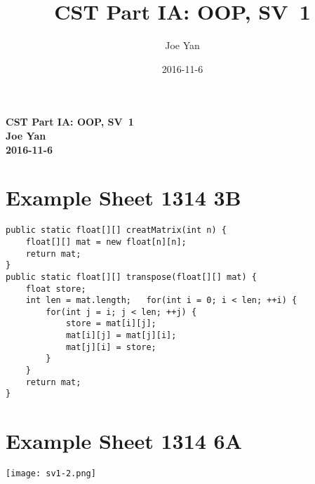 \documentclass[10pt,twoside,a4paper]{article}
\newcommand{\studentname}{Joe Yan}
\newcommand{\svworkdate}{2016-11-6}
\newcommand{\svcourse}{CST Part IA: OOP}
\newcommand{\svnumber}{1}
\begin{document}
\author{\studentname}
\title{\svcourse, SV~\svnumber}
\date{\svworkdate}

\textbf{\svcourse, SV~\svnumber}\\
\textbf{\studentname}\\
\textbf{\svworkdate}\\

\section{Example Sheet 1314 3B}
\begin{lstlisting}
public static float[][] creatMatrix(int n) {
	float[][] mat = new float[n][n];
	return mat;
}
public static float[][] transpose(float[][] mat) {
	float store;
	int len = mat.length;	for(int i = 0; i < len; ++i) {
		for(int j = i; j < len; ++j) {
			store = mat[i][j];
			mat[i][j] = mat[j][i];
			mat[j][i] = store;
		}
	}
	return mat;
}
\end{lstlisting}
\section{Example Sheet 1314 6A}
\texttt{[image: sv1-2.png]}
\end{document}
